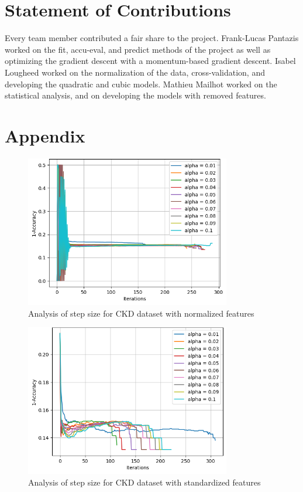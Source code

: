 \documentclass{article}
\begin{document}
\section{Statement of Contributions}

Every team member contributed a fair share to the project. Frank-Lucas Pantazis worked on the fit, accu-eval, and predict methods of the project as well as optimizing the gradient descent with a momentum-based gradient descent. Isabel Lougheed worked on the normalization of the data, cross-validation, and developing the quadratic and cubic models. Mathieu Mailhot worked on the statistical analysis, and on developing the models with removed features. 

\section{Appendix}

\begin{figure}[H]
  \centering
  \includegraphics[width=0.8\textwidth]{CKDmodel1.png}
  \caption{Analysis of step size for CKD dataset with normalized features}
  \label{fig:quad_ckd}
\end{figure}

\begin{figure}[H]
  \centering
  \includegraphics[width=0.8\textwidth]{CKDmodel2.png}
  \caption{Analysis of step size for CKD dataset with standardized features}
  \label{fig:quad_ckd}
\end{figure}
\end{document}
